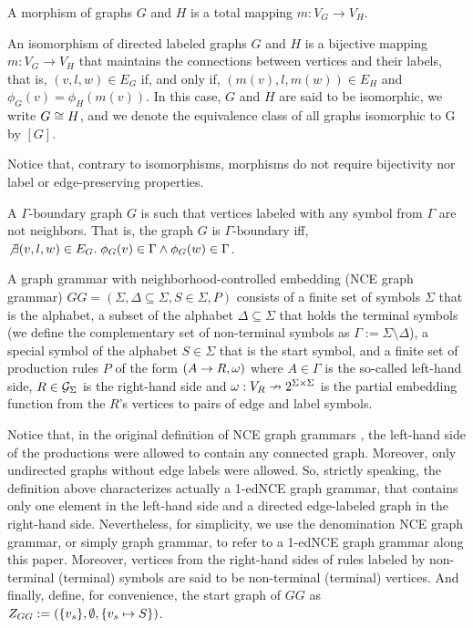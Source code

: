 \documentclass[runningheads]{llncs}
\begin{document}
\begin{definition}
	\label{def:morphism}
	A morphism of graphs $G$ and $H$ is a total mapping $m: V_G \to V_H$.
\end{definition}

\begin{definition}
	An isomorphism of directed labeled graphs $G$ and $H$ is a bijective mapping $m: V_G \to V_H$ that maintains the connections between vertices and their labels, that is, $(v,l,w) \in E_G$ if, and only if, $(m(v),l,m(w)) \in E_H$ and $\phi_G(v) = \phi_H(m(v))$. In this case, $G$ and $H$ are said to be isomorphic, we write $G \isomorph H$, and we denote the equivalence class of all graphs isomorphic to G by $[G]$.
\end{definition}

Notice that, contrary to isomorphisms, morphisms do not require bijectivity nor label or edge-preserving properties.

\begin{definition}
	A $\Gamma\text{-boundary}$ graph $G$ is such that vertices labeled with any symbol from $\Gamma$ are not neighbors. That is, the graph $G$ is $\Gamma\text{-boundary}$ iff, $\not\exists (v,l,w) \in E_G \. \phi_G(v) \in \Gamma \land \phi_G(w) \in \Gamma$.
\end{definition}

\begin{definition}
	\label{def:gg}
	A graph grammar with neighborhood-controlled embedding (NCE graph grammar) $GG = (\Sigma, \Delta \subseteq \Sigma, S \in \Sigma, P)$ consists of a finite set of symbols $\Sigma$ that is the alphabet, a subset of the alphabet $\Delta \subseteq \Sigma$ that holds the terminal symbols (we define the complementary set of non-terminal symbols as $\Gamma := \Sigma \setminus \Delta$), a special symbol of the alphabet $S \in \Sigma$ that is the start symbol, and a finite set of production rules $P$ of the form $(A \pro R, \omega)$ where $A \in \Gamma$ is the so-called left-hand side, $R \in \allgraphs{\Sigma}$ is the right-hand side and $\omega : V_R \pto 2^{\Sigma \times \Sigma}$ is the partial embedding function from the $R$'s vertices to pairs of edge and label symbols.
\end{definition}

Notice that, in the original definition of NCE graph grammars \cite{janssens1982graph}, the left-hand side of the productions were allowed to contain any connected graph. Moreover, only undirected graphs without edge labels were allowed. So, strictly speaking, the definition above characterizes actually a 1-edNCE graph grammar, that contains only one element in the left-hand side and a directed edge-labeled graph in the right-hand side. Nevertheless, for simplicity, we use the denomination NCE graph grammar, or simply graph grammar, to refer to a 1-edNCE graph grammar along this paper. Moreover, vertices from the right-hand sides of rules labeled by non-terminal (terminal) symbols are said to be non-terminal (terminal) vertices. And finally, define, for convenience, the start graph of $GG$ as $\startG{GG} := (\{v_s\},\emptyset,\{v_s \mapsto S\})$. 
\end{document}
